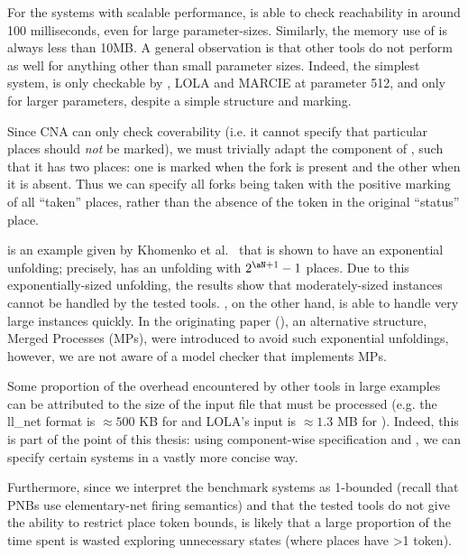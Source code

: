 For the systems with scalable performance, \penrose{} is able to check
reachability in around 100 milliseconds, even for large parameter-sizes.
Similarly, the memory use of \penrose{} is always less than 10MB. A general
observation is that other tools do not perform as well for anything other than
small parameter sizes. Indeed, the simplest system, \bufferSys{-} is only
checkable by \penrose{}, LOLA and MARCIE at parameter 512, and only \penrose{}
for larger parameters, despite a simple structure and marking.

Since CNA can only check coverability (i.e. it cannot specify that particular
places should \emph{not} be marked), we must trivially adapt the \forkC{}
component of \diningphilosophersSys{-}, such that it has two places: one is
marked when the fork is present and the other when it is absent. Thus we can
specify all forks being taken with the positive marking of all ``taken''
places, rather than the absence of the token in the original ``status'' place.

\iteratedchoiceSys{-} is an example given by {Khomenko et
al.}~\cite{Khomenko2005} that is shown to have an exponential unfolding;
precisely, \iteratedchoiceSys{\aN} has an unfolding with $2^{\aN + 1} - 1$
places. Due to this exponentially-sized unfolding, the results show that
moderately-sized instances cannot be handled by the tested tools. \penrose{},
on the other hand, is able to handle very large instances quickly. In the
originating paper (\cite{Khomenko2005}), an alternative structure, Merged
Processes (MPs), were introduced to avoid such exponential unfoldings, however,
we are not aware of a model checker that implements MPs.

Some proportion of the overhead encountered by other tools in large examples
can be attributed to the size of the input file that must be processed (e.g.
the ll\_net format is $\approx500$ KB for  and LOLA's input is
$\approx1.3$ MB for ). Indeed, this is part of the point of this
thesis: using component-wise specification and \DSL{}, we can specify certain
systems in a vastly more concise way.

Furthermore, since we interpret the benchmark systems as 1-bounded (recall that
PNBs use elementary-net firing semantics) and that the tested tools do not give
the ability to restrict place token bounds, is likely that a large proportion
of the time spent is wasted exploring unnecessary states (where places have >1
token).

